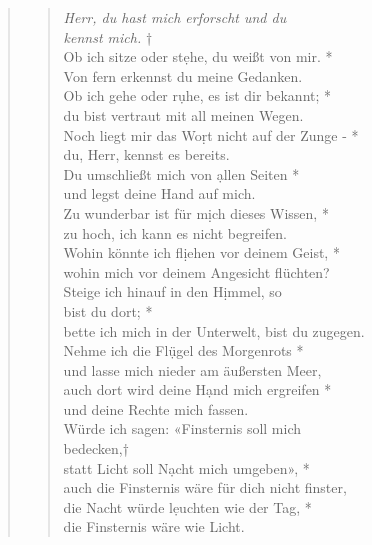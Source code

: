 
\vspace{0.3cm}
\begin{quote}
 


\begin{verse}
 \textit{Herr, du hast mich erforscht und du \\ kennst mich.} †\\
Ob ich sitze oder st\d ehe, du weißt von mir. *\\
Von fern erkennst du meine Gedanken.\\ \vin 
Ob ich gehe oder r\d uhe, es ist dir bekannt; *\\ \vin
du bist vertraut mit all meinen Wegen.\\
Noch liegt mir das Wo\d rt nicht auf der Zunge - *\\
du, Herr, kennst es bereits.\\ \vin
Du umschließt mich von \d allen Seiten *\\ \vin
und legst deine Hand auf mich.\\
Zu wunderbar ist für m\d ich dieses Wissen, *\\
zu hoch, ich kann es nicht begreifen.\\ \vin 
Wohin könnte ich fl\d iehen vor deinem Geist, *\\ \vin
wohin mich vor deinem Angesicht flüchten? \\
Steige ich hinauf in den H\d immel, so \\bist du dort; *\\
bette ich mich in der Unterwelt, bist du zugegen.\\ 
\vin Nehme ich die Fl\d ügel des Morgenrots *\\
\vin und lasse mich nieder am äußersten Meer, \\ 
auch dort wird deine H\d and mich ergreifen *\\ 
und deine Rechte mich fassen.\\
\vin Würde ich sagen: «Finsternis soll mich\\ \vin bedecken,†\\
\vin statt Licht soll N\d acht mich umgeben», *\\
\vin auch die Finsternis wäre für dich nicht finster, \\ 
die Nacht würde l\d euchten wie der Tag, *\\ 
die Finsternis wäre wie Licht.\\
\end{verse}
\end{quote}

